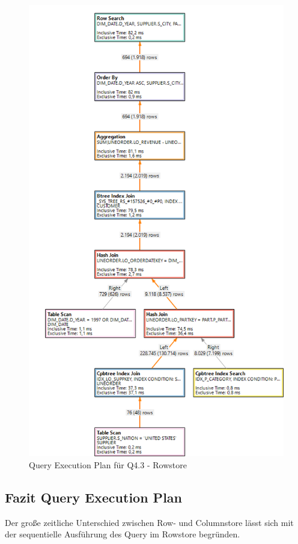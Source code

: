 \begin{figure}[H]

	\centering
	\includegraphics[scale=0.4]{images/row_q43}
	\caption{Query Execution Plan für Q4.3 - Rowstore 	\label{qepRow} }
\end{figure}

\subsection{Fazit Query Execution Plan}
Der große zeitliche Unterschied zwischen Row- und Columnstore lässt sich mit der sequentielle Ausführung des Query im Rowstore begründen. 

